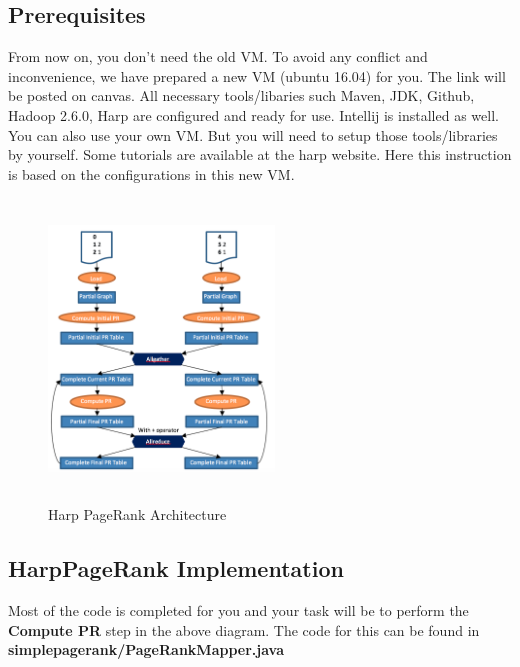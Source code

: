 \subsection*{Prerequisites}
From now on, you don't need the old VM. To avoid any conflict and
inconvenience, we have prepared a new VM (ubuntu 16.04) for you. The link will
be posted on canvas. All necessary tools/libaries such Maven, JDK, Github,
Hadoop 2.6.0, Harp are configured and ready for use. Intellij is installed as
well. You can also use your own VM. But you will need to setup those
tools/libraries by yourself. Some tutorials are available at the harp
website. Here this instruction is based on the configurations in
this new VM.

\begin{figure}[!htbp]
\includegraphics[width=6cm,height=8cm]{section/icloud/assignment/problems/project7/p8}
\centering
\caption{Harp PageRank Architecture}
\end{figure}

\subsection*{HarpPageRank Implementation}
Most of the code is completed for you and your task will be to perform the
\textbf{Compute PR} step in the above diagram. The code for this can be found
in \textbf{simplepagerank/PageRankMapper.java}



